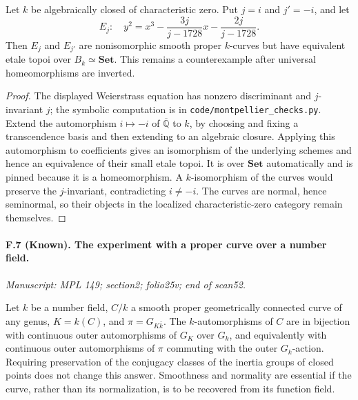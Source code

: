 Let $k$ be algebraically closed of characteristic zero. Put $j=i$ and
$j'=-i$, and let
\[
 E_j:\quad y^2=x^3-\frac{3j}{j-1728}x-\frac{2j}{j-1728}.
\]
Then $E_j$ and $E_{j'}$ are nonisomorphic smooth proper $k$-curves but
have equivalent etale topoi over $B_k\simeq\mathbf{Set}$. This remains a
counterexample after universal homeomorphisms are inverted.

\begin{proof}
The displayed Weierstrass equation has nonzero discriminant and
$j$-invariant $j$; the symbolic computation is in
\texttt{code/montpellier\_checks.py}. Extend the automorphism
$i\mapsto-i$ of $\overline{\mathbb Q}$ to $k$, by choosing and fixing a
transcendence basis and then extending to an algebraic closure. Applying
this automorphism to coefficients gives an isomorphism of the underlying
schemes and hence an equivalence of their small etale topoi. It is over
$\mathbf{Set}$ automatically and is pinned because it is a homeomorphism.
A $k$-isomorphism of the curves would preserve the $j$-invariant,
contradicting $i\ne-i$. The curves are normal, hence seminormal, so their
objects in the localized characteristic-zero category remain themselves.
\end{proof}

\paragraph{F.7 (Known). The experiment with a proper
curve over a number field.}
\textit{Manuscript: MPL 149; section2; folio25v; end of scan52.}

Let $k$ be a number field, $C/k$ a smooth proper geometrically connected
curve of any genus, $K=k(C)$, and
$\pi=G_{K\bar k}$. The $k$-automorphisms of $C$ are in bijection with
continuous outer automorphisms of $G_K$ over $G_k$, and equivalently with
continuous outer automorphisms of $\pi$ commuting with the outer
$G_k$-action. Requiring preservation of the conjugacy classes of the
inertia groups of closed points does not change this answer. Smoothness
and normality are essential if the curve, rather than its normalization,
is to be recovered from its function field.

